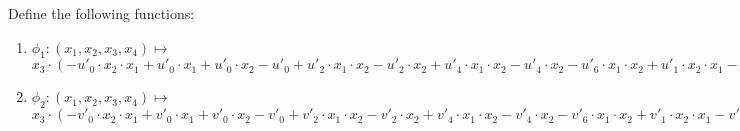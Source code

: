 Define the following functions:
\begin{enumerate}
    \item $\phi_1: (x_1, x_2, x_3, x_4) \mapsto $ \\
    $x_3 \cdot (-u'_0 \cdot x_2 \cdot x_1 + u'_0 \cdot x_1 + u'_0 \cdot x_2
    - u'_0 + u'_2 \cdot x_1 \cdot x_2 - u'_2\cdot x_2 + u'_4 \cdot x_1 \cdot x_2
    - u'_4\cdot x_2 -u'_6 \cdot x_1 \cdot x_2 + u'_1 \cdot x_2 \cdot x_1
    - u'_1 \cdot x_1 - u'_1 \cdot x_2 + u'_1  - u'_3 \cdot x_1 \cdot x_2 + u'_3\cdot x_2
    - u'_5 \cdot x_1 \cdot x_2 + u'_5\cdot x_2 + u'_7 \cdot x_1 \cdot x_2) -
    (x_4 - u'_0 \cdot x_2 \cdot x_1 + u'_0 \cdot x_1 + u'_0 \cdot x_2
    - u'_0 + u'_2 \cdot x_1 \cdot x_2 - u'_2\cdot x_2 + u'_4 \cdot x_1 \cdot x_2
    - u'_4\cdot x_2 -u'_6 \cdot x_1 \cdot x_2)$
    \item $\phi_2: (x_1, x_2, x_3, x_4) \mapsto $ \\
    $x_3 \cdot (-v'_0 \cdot x_2 \cdot x_1 + v'_0 \cdot x_1 + v'_0 \cdot x_2
    - v'_0 + v'_2 \cdot x_1 \cdot x_2 -v'_2 \cdot x_2 + v'_4 \cdot x_1 \cdot x_2
    - v'_4 \cdot x_2 - v'_6 \cdot x_1 \cdot x_2 + v'_1 \cdot x_2 \cdot x_1
    - v'_1 \cdot x_1 - v'_1 \cdot x_2 + v'_1  - v'_3 \cdot x_1 \cdot x_2
    + v'_3 \cdot x_2 - v'_5 \cdot x_1 \cdot x_2 + v'_5 \cdot x_2
    + v'_7 \cdot x_1 \cdot x_2) - (x_4 - v'_0 \cdot x_2 \cdot x_1
    + v'_0 \cdot x_1 + v'_0 \cdot x_2 - v'_0 + v'_2 \cdot x_1 \cdot x_2
    - v'_2 \cdot x_2 + v'_4 \cdot x_1 \cdot x_2 - v'_4 \cdot x_2 - v'_6 \cdot x_1 \cdot x_2) $
\end{enumerate}

